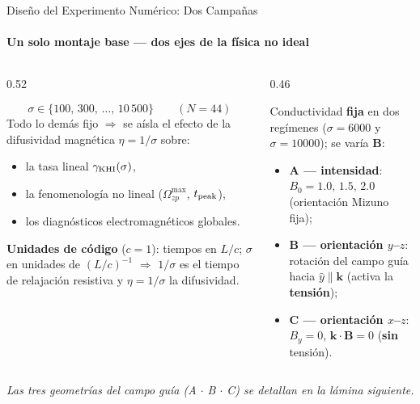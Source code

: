 \documentclass[aspectratio=169,9pt]{beamer}
\begin{document}
\begin{frame}{Dise\~no del Experimento Num\'erico: Dos Campa\~nas}
\framesubtitle{Un solo montaje base --- dos ejes de la f\'isica no ideal}
\begin{columns}[T]
\begin{column}{0.52\textwidth}
  \begin{tcolorbox}[EQ={Campa\~na 1 --- Conductividad (objetivos 1--3)}]
    \scriptsize
    \[
      \sigma\in\{100,\,300,\,\ldots,\,10\,500\}\qquad(N=44)
    \]
    Todo lo dem\'as fijo $\Rightarrow$ se a\'isla el efecto de la
    difusividad magn\'etica $\eta=1/\sigma$ sobre:
    \begin{itemize}\setlength\itemsep{1pt}
      \item la tasa lineal $\gamma_{\rm KHI}(\sigma)$,
      \item la fenomenolog\'ia no lineal ($\Omega_{zp}^{\max}$, $t_{\rm peak}$),
      \item los diagn\'osticos electromagn\'eticos globales.
    \end{itemize}
    \vspace{2pt}
    {\tiny\color{INF3} \textbf{Unidades de c\'odigo} ($c=1$): tiempos en
     $L/c$; $\sigma$ en unidades de $(L/c)^{-1}$ $\Rightarrow$ $1/\sigma$ es
     el tiempo de relajaci\'on resistiva y $\eta=1/\sigma$ la difusividad.}
  \end{tcolorbox}
\end{column}
\begin{column}{0.46\textwidth}
  \pause
  \begin{tcolorbox}[HYP={Campa\~na 2 --- Campo magn\'etico (objetivo 4)}]
    \scriptsize
    Conductividad \textbf{fija} en dos reg\'imenes
    ($\sigma=6000$ y $\sigma=10000$); se var\'ia $\mathbf B$:
    \begin{itemize}\setlength\itemsep{1pt}
      \item \textbf{A --- intensidad}: $B_0=1.0,\,1.5,\,2.0$
            (orientaci\'on Mizuno fija);
      \item \textbf{B --- orientaci\'on $y$--$z$}: rotaci\'on del campo gu\'ia
            hacia $\hat y\parallel\mathbf k$ (activa la \textbf{tensi\'on});
      \item \textbf{C --- orientaci\'on $x$--$z$}: $B_y=0$,
            $\mathbf k\cdot\mathbf B=0$ (\textbf{sin} tensi\'on).
    \end{itemize}
  \end{tcolorbox}
\end{column}
\end{columns}
\pause\vfill
\begin{center}
  {\scriptsize\color{INF3}\itshape Las tres geometr\'ias del campo gu\'ia
   (A $\cdot$ B $\cdot$ C) se detallan en la l\'amina siguiente.}
\end{center}
\vspace{0.15cm}
\end{frame}
\end{document}

